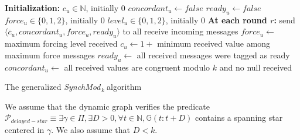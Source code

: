 \documentclass[11pt,letterpaper]{article}
\newcommand{\cent}{\gamma}
\newcommand{\SM}{{\em SynchMod}$_{\,k}\ $}
\begin{document}
\begin{algorithm}[htb]
	\DontPrintSemicolon
	\textbf{Initialization:} \;
	\Indp
		$c_u \in \mathds{N}$, initially 0 \;
		$concordant_u \leftarrow false$ \;
		$ready_u \leftarrow false$ \;
		$force_u \in \{0, 1, 2\}$, initially 0 \;
		$level_u \in \{0, 1, 2\}$, initially 0 \;
	\BlankLine
	\Indm
	\textbf{At each round $r$:} \;
	\Indp
		send $\langle \overline{c}_u, concordant_u, force_u, ready_u \rangle$ to all  \;
		receive incoming messages \;
		$force_u \leftarrow$ maximum forcing level received \;\label{line:force}
		$c_u \leftarrow 1+$ minimum received value among maximum force messages \;\label{line:min-z-end} 
		$ready_u \leftarrow$ all received messages were tagged as ready \; \label{line:ready-gossip} 
		$concordant_u \leftarrow$ all received values are congruent modulo $k$ and no null received \; \label{line:conc-gossip}
	\Indm
\caption{The generalized \SM algorithm} 
\end{algorithm}

We assume that the dynamic graph verifies the predicate $\mathcal{P}_{delayed-star} \equiv \exists \cent \in \Pi, \exists D > 0, \forall t \in \mathds{N}, \mathds{G}(t:t+D)$
contains a spanning star centered in $\cent$. We also assume that $D < k$.
\end{document}
